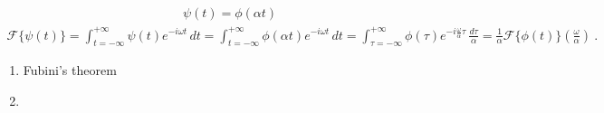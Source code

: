 \documentclass[letterpaper,10pt,english]{jupyterBook}
\begin{document}
\begin{equation*}
\begin{split}\psi(t) = \phi(\alpha t)\end{split}
\end{equation*}\begin{equation*}
\begin{split}
\mathscr{F}\{ \psi(t) \} 
 = \int_{t=-\infty}^{+\infty} \psi(t) e^{-i \omega t} \, dt 
 = \int_{t=-\infty}^{+\infty} \phi(\alpha t) e^{-i \omega t} \, dt 
 = \int_{\tau = -\infty}^{+\infty} \phi(\tau) e^{-i \frac{\omega}{\alpha} \tau} \, \frac{d \tau}{\alpha} 
 = \frac{1}{\alpha} \mathscr{F}\{ \phi(t) \}\left( \frac{\omega}{\alpha} \right) \ .
\end{split}
\end{equation*}\begin{enumerate}
%
\setcounter{enumi}{2}
\item {} 
\sphinxAtStartPar
Fubini’s theorem

\item {} 
\end{enumerate}
\end{document}
